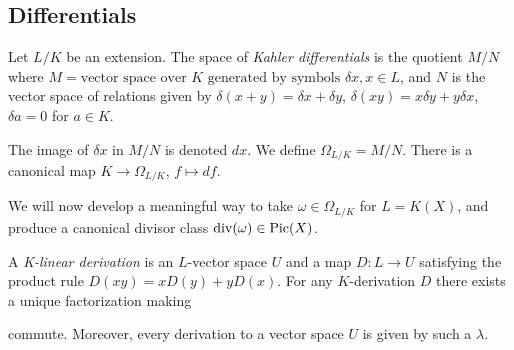 \documentclass[10pt,a4paper,rgb]{article}
\begin{document}
\subsection{Differentials}
Let $L/K$ be an extension. The space of \emph{Kahler differentials} is the quotient $M/N$ where $M = \text{vector space over $K$ generated by symbols } \delta x, x \in L$, and $N$ is the vector space of relations given by $\delta(x+y)=\delta x+\delta y$, $\delta(xy) = x\delta y+y\delta x$, $\delta a =0$ for $a \in K$. 

The image of $\delta x$ in $M/N$ is denoted $dx$. We define $\Omega_{L/K} = M/N$. There is a canonical map $K \to \Omega_{L/K}$, $f \mapsto df$.

We will now develop a meaningful way to take $\omega \in \Omega_{L/K}$ for $L = K(X)$, and produce a canonical divisor class $\operatorname{div}(\omega) \in \operatorname{Pic}(X)$.

A \emph{K-linear derivation} is an $L$-vector space $U$ and a map $D: L \to U$ satisfying the product rule $D(xy) = xD(y) + yD(x)$. For any $K$-derivation $D$ there exists a unique factorization making
\begin{center}
\end{center}
commute. Moreover, every derivation to a vector space $U$ is given by such a $\lambda$.
\end{document}
